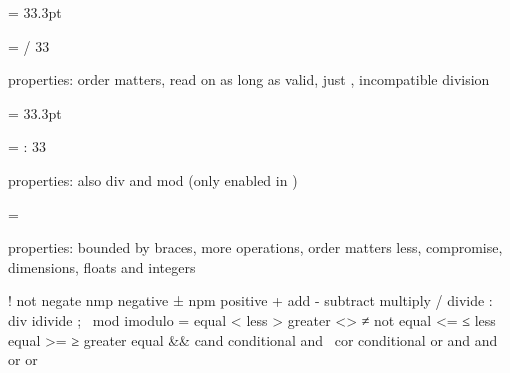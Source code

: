 \stopbuffer

\typebuffer \getbuffer \the\scratchdimen

\startbuffer
\scratchdimen = 33.3pt \divide{}
\stopbuffer

\typebuffer \getbuffer \the\scratchdimen

\startbuffer
\scratchdimen = \dimexpr 33.3pt / 33\relax
\stopbuffer

\typebuffer \getbuffer \the\scratchdimen

properties: order matters, read on as long as valid, just \type {+-/*},
incompatible division
\stoptitle

\starttitle[title=Simple \ETEX\ expressions in \LUAMETATEX]

\startbuffer
\scratchdimen = 33.3pt \divide{}
\stopbuffer

\typebuffer \getbuffer \the\scratchdimen
\startbuffer
\scratchdimen = \dimexpr 33.3pt : 33\relax
\stopbuffer

\typebuffer \getbuffer \the\scratchdimen

properties: also div and mod \type {: ;} (only enabled in \CONTEXT)

\stoptitle

\starttitle[title=Extended \ETEX\ expressions]

\startbuffer
\scratchdimen = \dimexpression {10pt + 1ex}
\stopbuffer

\typebuffer \getbuffer \the\scratchdimen

properties: bounded by braces, more operations, order matters less, compromise,
dimensions, floats and integers

\startcolumns
\starttabulate[|Tl|l|]
\NC !   not   \NC negate \NC \NR
\NC {}   nmp   \NC negative \NC \NR %
\NC ±   npm   \NC positive \NC \NR
\NC +         \NC add \NC \NR
\NC -         \NC subtract \NC \NR
\NC *         \NC multiply \NC \NR
\NC /         \NC divide \NC \NR
\NC :   div   \NC idivide \NC \NR
\NC ;   \ mod   \NC imodulo \NC \NR
\NC =         \NC equal \NC \NR
\NC <         \NC less \NC \NR
\NC >         \NC greater \NC \NR
\NC <>  ≠     \NC not equal \NC \NR
\NC <=  ≤     \NC less equal \NC \NR
\NC >=  ≥     \NC greater equal \NC \NR
\NC &&  cand  \NC conditional and \NC \NR
\NC {}\  cor   \NC conditional or \NC \NR
\NC and       \NC and \NC \NR
\NC or        \NC or \NC \NR
\stoptabulate
\stopcolumns

\stoptitle

